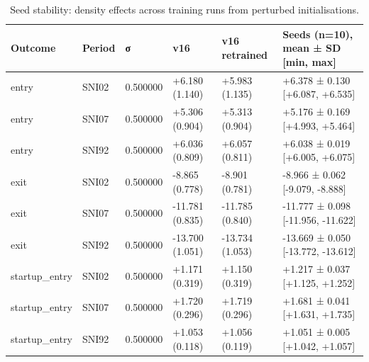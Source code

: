 \begin{table}
\caption{Seed stability: density effects across training runs from perturbed initialisations.}
\label{tab:seed_stability_regional}
\begin{tabular}{llllll}
\toprule
Outcome & Period & σ & v16 & v16 retrained & Seeds (n=10), mean ± SD [min, max] \\
\midrule
entry & SNI02 & 0.500000 & +6.180 (1.140) & +5.983 (1.135) & +6.378 ± 0.130 [+6.087, +6.535] \\
entry & SNI07 & 0.500000 & +5.306 (0.904) & +5.313 (0.904) & +5.176 ± 0.169 [+4.993, +5.464] \\
entry & SNI92 & 0.500000 & +6.036 (0.809) & +6.057 (0.811) & +6.038 ± 0.019 [+6.005, +6.075] \\
exit & SNI02 & 0.500000 & -8.865 (0.778) & -8.901 (0.781) & -8.966 ± 0.062 [-9.079, -8.888] \\
exit & SNI07 & 0.500000 & -11.781 (0.835) & -11.785 (0.840) & -11.777 ± 0.098 [-11.956, -11.622] \\
exit & SNI92 & 0.500000 & -13.700 (1.051) & -13.734 (1.053) & -13.669 ± 0.050 [-13.772, -13.612] \\
startup\_entry & SNI02 & 0.500000 & +1.171 (0.319) & +1.150 (0.319) & +1.217 ± 0.037 [+1.125, +1.252] \\
startup\_entry & SNI07 & 0.500000 & +1.720 (0.296) & +1.719 (0.296) & +1.681 ± 0.041 [+1.631, +1.735] \\
startup\_entry & SNI92 & 0.500000 & +1.053 (0.118) & +1.056 (0.119) & +1.051 ± 0.005 [+1.042, +1.057] \\
\bottomrule
\end{tabular}
\end{table}

